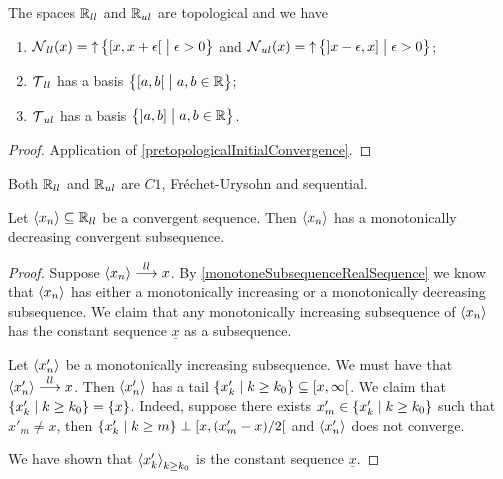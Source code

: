 \begin{proposition}
The spaces $\mathbb{R}_{ll}$ and $\mathbb{R}_{ul}$ are topological and we have
\begin{enumerate}
\item $\neighbourhood_{ll}(x) = \upset \setbuilder[\big]{\interval[co]{x,x+\epsilon}}{\epsilon > 0}$ and $\neighbourhood_{ul}(x) = \upset \setbuilder[\big]{\interval[oc]{x-\epsilon, x}}{\epsilon > 0}$;
\item $\operatorname{\mathcal{T}}_{ll}$ has a basis $\setbuilder[\big]{\interval[co]{a,b}}{a,b\in \R}$;
\item $\operatorname{\mathcal{T}}_{ul}$ has a basis $\setbuilder[\big]{\interval[oc]{a,b}}{a,b\in \R}$.
\end{enumerate}
\end{proposition}
\begin{proof}
Application of \ref{pretopologicalInitialConvergence}.
\end{proof}
\begin{corollary} \label{SorgenfreyLineC1}
Both $\mathbb{R}_{ll}$ and $\mathbb{R}_{ul}$ are $C1$, Fréchet-Urysohn and sequential.
\end{corollary}

\begin{lemma} \label{lowerLimitConvergenceDecreasingSubsequence}
Let $\left\langle x_n \right\rangle\subseteq \mathbb{R}_{ll}$ be a convergent sequence. Then $\left\langle x_n \right\rangle$ has a monotonically decreasing convergent subsequence.
\end{lemma}
\begin{proof}
Suppose $\left\langle x_n \right\rangle \overset{ll}{\longrightarrow} x$. By \ref{monotoneSubsequenceRealSequence} we know that $\left\langle x_n \right\rangle$ has either a monotonically increasing or a monotonically decreasing subsequence. We claim that any monotonically increasing subsequence of $\left\langle x_n \right\rangle$ has the constant sequence $\underline{x}$ as a subsequence.

Let $\left\langle x'_n \right\rangle$ be a monotonically increasing subsequence. We must have that $\left\langle x'_n \right\rangle \overset{ll}{\longrightarrow} x$. Then $\left\langle x'_n \right\rangle$ has a tail $\setbuilder{x'_k}{k \geq k_0}\subseteq \interval[co]{x,\infty}$. We claim that $\setbuilder{x'_k}{k \geq k_0} = \{x\}$. Indeed, suppose there exists $x'_m \in \setbuilder{x'_k}{k \geq k_0}$ such that $x'_m \neq x$, then $\setbuilder{x'_k}{k \geq m} \perp \interval[co]{x, (x'_m-x)/2}$ and $\left\langle x'_n \right\rangle$ does not converge.

We have shown that $\left\langle x'_k \right\rangle_{k\geq k_0}$ is the constant sequence $\underline{x}$.
\end{proof}

